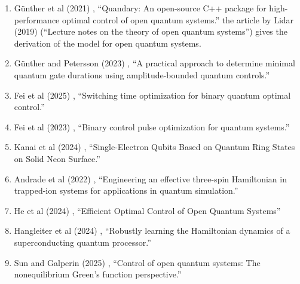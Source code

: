 \documentclass[a4paper,fleqn]{cas-sc}
\begin{document}
\begin{enumerate}
\item Günther et al (2021) \cite{9651392}, ``Quandary: An open-source C++ package for high-performance optimal control of open quantum systems.'' the article
by Lidar (2019) \cite{lidar2019lecture} (``Lecture notes on the theory of open quantum systems'') gives the derivation of the model for open quantum systems.
\item Günther and Petersson (2023) \cite{gunther2023practical}, ``A practical approach to determine minimal quantum gate durations using amplitude-bounded quantum controls.''
\item Fei et al (2025) \cite{fei2025switching}, ``Switching time optimization for binary quantum optimal control.''
\item Fei et al (2023) \cite{fei2023binary}, ``Binary control pulse optimization for quantum systems.''
\item Kanai et al (2024) \cite{PhysRevLett.132.250603}, ``Single-Electron Qubits Based on Quantum Ring States on Solid Neon Surface.''
\item Andrade et al (2022) \cite{Andrade_2022}, ``Engineering an effective three-spin Hamiltonian in trapped-ion systems for applications in quantum simulation.''
\item He et al (2024) \cite{he2024efficientoptimalcontrolopen}, ``Efficient Optimal Control of Open Quantum Systems''
\item Hangleiter et al (2024) \cite{hangleiter2024robustly}, ``Robustly learning the Hamiltonian dynamics of a superconducting quantum processor.''
\item Sun and Galperin (2025) \cite{sun2025control}, ``Control of open quantum systems: The nonequilibrium Green’s function perspective.''

\end{enumerate}
\end{document}

